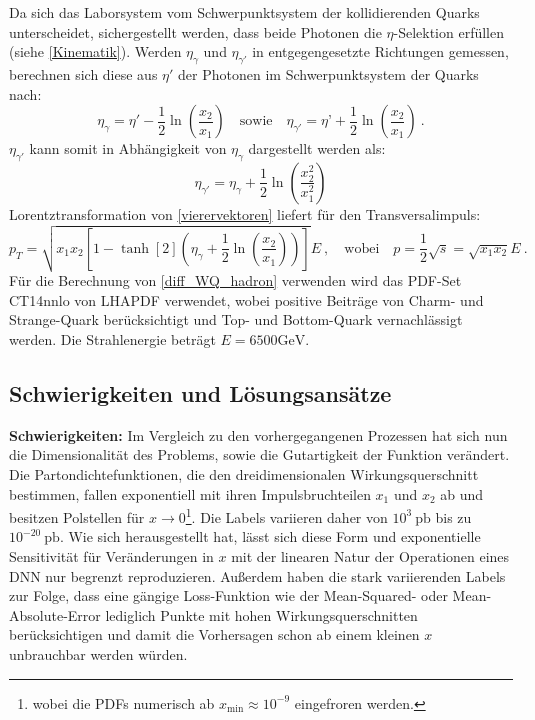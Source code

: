 Da sich das Laborsystem vom Schwerpunktsystem der kollidierenden Quarks unterscheidet, sichergestellt werden, dass beide Photonen die $\eta$-Selektion erfüllen (siehe \textsf{\autoref{Kinematik}}). Werden $\eta_{\gamma}$ und $\eta_{\gamma'}$ in entgegengesetzte Richtungen gemessen, berechnen sich diese aus $\eta'$ der Photonen im Schwerpunktsystem der Quarks nach: 
\begin{equation}
\eta_{\gamma} = \eta' -\frac{1}{2}\ln(\frac{x_2}{x_1}) \quad \text{sowie} \quad \eta_{\gamma'} = \eta’ + \frac{1}{2}\ln(\frac{x_2}{x_1})~.
\end{equation}
$\eta_{\gamma'}$ kann somit in Abhängigkeit von $\eta_{\gamma}$ dargestellt werden als:
\begin{equation} 
\eta_{\gamma'} = \eta_{\gamma} + \frac{1}{2}  \ln(\frac{x_2^2}{x_1^2})
\end{equation}
Lorentztransformation von \textsf{\autoref{vierervektoren}} liefert für den Transversalimpuls:
\begin{equation}
	p_T = \sqrt{x_1 x_2 \left[1-\tanh[2](\eta_{\gamma} + \frac{1}{2}\ln(\frac{x_2}{x_1}))\right]}E~, \quad \text{wobei} \quad p = \frac{1}{2} \sqrt{s} = \sqrt{x_1 
	x_2} E~.
	\label{p_T}
\end{equation}
Für die Berechnung von \textsf{\autoref{diff_WQ_hadron}} verwenden wird das PDF-Set CT14nnlo von LHAPDF \cite{LHAPDF} verwendet, wobei positive Beiträge von Charm- und Strange-Quark berücksichtigt und Top- und Bottom-Quark vernachlässigt werden. Die Strahlenergie beträgt $E = 6500 \text{GeV}$.
\subsection{Schwierigkeiten und Lösungsansätze} %
\textbf{Schwierigkeiten:}
Im Vergleich zu den vorhergegangenen Prozessen hat sich nun die Dimensionalität des Problems, sowie die Gutartigkeit der Funktion verändert. Die Partondichtefunktionen, die den dreidimensionalen Wirkungsquerschnitt bestimmen, fallen exponentiell mit ihren Impulsbruchteilen $x_1$ und $x_2$ ab und besitzen Polstellen für $x \rightarrow 0$\footnote{wobei die PDFs numerisch ab $x_{\text{min}} \approx 10^{-9}$ eingefroren werden.}. Die Labels variieren daher von $10^{3}~\text{pb}$ bis zu $10^{-20}~\text{pb}$. Wie sich herausgestellt hat, lässt sich diese Form und exponentielle Sensitivität für Veränderungen in $x$ mit der linearen Natur der Operationen eines DNN nur begrenzt reproduzieren.
Außerdem haben die stark variierenden Labels zur Folge, dass eine gängige Loss-Funktion wie der Mean-Squared- oder Mean-Absolute-Error lediglich Punkte mit hohen Wirkungsquerschnitten berücksichtigen und damit die Vorhersagen schon ab einem kleinen $x$ unbrauchbar werden würden. 

